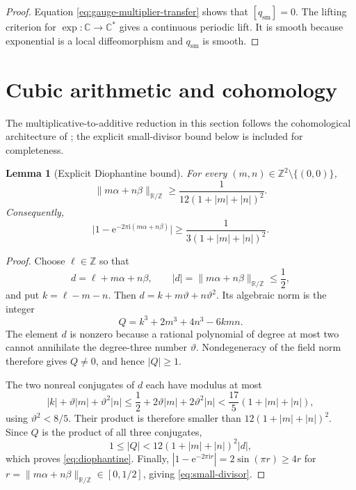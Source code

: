 \documentclass[11pt,reqno]{amsart}
\numberwithin{equation}{section}
\newtheorem{lemma}[theorem]{Lemma}
\theoremstyle{definition}
\newcommand{\R}{\mathbb R}
\newcommand{\C}{\mathbb C}
\newcommand{\Z}{\mathbb Z}
\newcommand{\norm}[1]{\lVert #1\rVert}
\newcommand{\abs}[1]{\lvert #1\rvert}
\newcommand{\e}{\mathrm e}
\newcommand{\ii}{\mathrm i}
\begin{document}
\begin{proof}
Equation \eqref{eq:gauge-multiplier-transfer} shows that
$[q_{\mathrm{sm}}]=0$.  The lifting criterion for
$\exp:\C\to\C^*$ gives a continuous periodic lift.  It is smooth because
exponential is a local diffeomorphism and $q_{\mathrm{sm}}$ is smooth.
\end{proof}

\section{Cubic arithmetic and cohomology}
\label{sec:cohomology}

The multiplicative-to-additive reduction in this section follows the
cohomological architecture of \cite[\S7]{FPPV2026}; the explicit
small-divisor bound below is included for completeness.

\begin{lemma}[Explicit Diophantine bound]\label{lem:diophantine}
For every $(m,n)\in\Z^2\setminus\{(0,0)\}$,
\begin{equation}\label{eq:diophantine}
 \norm{m\alpha+n\beta}_{\R/\Z}
 \ge\frac1{12(1+|m|+|n|)^2}.
\end{equation}
Consequently,
\begin{equation}\label{eq:small-divisor}
 \abs{1-\e^{-2\pi\ii(m\alpha+n\beta)}}
 \ge\frac1{3(1+|m|+|n|)^2}.
\end{equation}
\end{lemma}

\begin{proof}
Choose $\ell\in\Z$ so that
\[
 d=\ell+m\alpha+n\beta,\qquad
 |d|=\norm{m\alpha+n\beta}_{\R/\Z}\le\frac12,
\]
and put $k=\ell-m-n$.  Then $d=k+m\vartheta+n\vartheta^2$.  Its algebraic
norm is the integer
\begin{equation}\label{eq:algebraic-norm}
 Q=k^3+2m^3+4n^3-6kmn.
\end{equation}
The element $d$ is nonzero because a rational polynomial of degree at most
two cannot annihilate the degree-three number $\vartheta$.  Nondegeneracy of
the field norm therefore gives $Q\ne0$, and hence $|Q|\ge1$.

The two nonreal conjugates of $d$ each have modulus at most
\[
 |k|+\vartheta|m|+\vartheta^2|n|
 \le\frac12+2\vartheta|m|+2\vartheta^2|n|
 <\frac{17}{5}(1+|m|+|n|),
\]
using $\vartheta^2<8/5$.  Their product is therefore smaller than
$12(1+|m|+|n|)^2$.  Since $Q$ is the product of all three conjugates,
\[
 1\le|Q|<12(1+|m|+|n|)^2|d|,
\]
which proves \eqref{eq:diophantine}.  Finally,
$|1-\e^{-2\pi\ii r}|=2\sin(\pi r)\ge4r$ for
$r=\norm{m\alpha+n\beta}_{\R/\Z}\in[0,1/2]$, giving
\eqref{eq:small-divisor}.
\end{proof}
\end{document}
